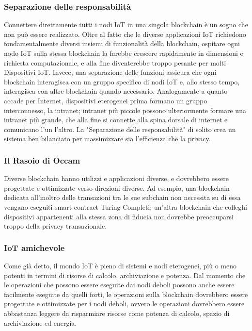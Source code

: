 \documentclass[a4paper,12pt,draft]{article}
\begin{document}
\subsubsection{Separazione delle responsabilità}
Connettere direttamente tutti i nodi IoT in una singola blockchain è un sogno che non può essere realizzato. Oltre al fatto che le diverse applicazioni IoT richiedono fondamentalmente diversi insiemi di funzionalità della blockchain, ospitare ogni nodo IoT sulla stessa blockchain la farebbe crescere rapidamente in dimensioni e richiesta computazionale, e alla fine diventerebbe troppo pesante per molti Dispositivi IoT. Invece, una separazione delle funzioni assicura che ogni blockchain interagisca con un gruppo specifico di nodi IoT e, allo stesso tempo, interagisca con altre blockchain quando necessario. Analogamente a quanto accade per Internet, dispositivi eterogenei prima formano un gruppo interconnesso, la intranet; intranet più piccole possono ulteriormente formare una intranet più grande, che alla fine si connette alla spina dorsale di internet e comunicano l'un l'altro. 
La "Separazione delle responsabilità" di solito crea un sistema ben bilanciato per massimizzare sia l'efficienza che la privacy.

\subsubsection{Il Rasoio di Occam}
Diverse blockchain hanno utilizzi e applicazioni diverse, e dovrebbero essere progettate e ottimizzate verso direzioni diverse. Ad esempio, una blockchain dedicata all'inoltro delle transazioni tra le sue subchain non necessita su di essa vengano eseguiti smart-contract Turing-Completi; un'altra blockchain che colleghi dispositivi appartenenti alla stessa zona di fiducia non dovrebbe preoccuparsi troppo della privacy transazionale.

\subsubsection{IoT amichevole}
Come già detto, il mondo IoT è pieno di sistemi e nodi eterogenei, più o meno potenti in termini di risorse di calcolo, archiviazione e potenza. Dal momento che le operazioni che possono essere eseguite dai nodi deboli possono anche essere facilmente eseguite da quelli forti, le operazioni sulla blockchain dovrebbero essere progettate e ottimizzate per i nodi deboli, ovvero le operazioni dovrebbero essere abbastanza leggere da risparmiare risorse come potenza di calcolo, spazio di archiviazione ed energia.


\pagebreak




\end{document}
